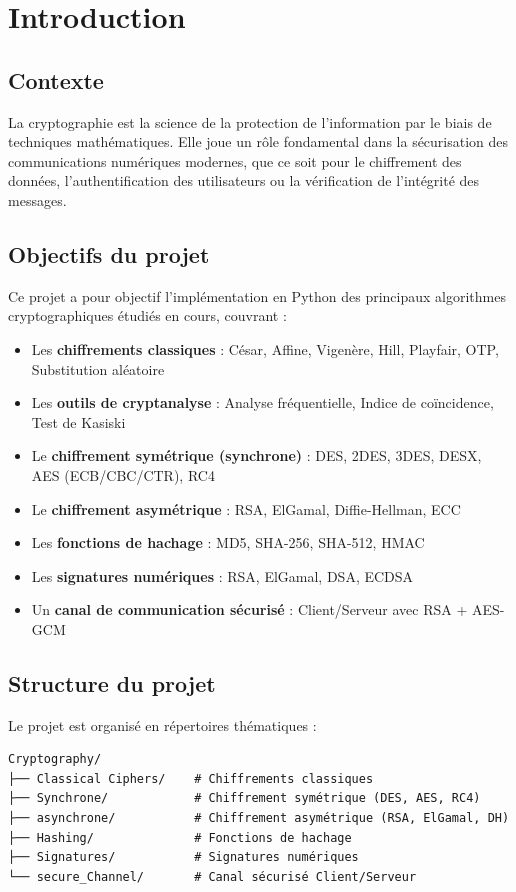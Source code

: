 \documentclass[12pt,a4paper]{report}
\begin{document}
\tableofcontents
\newpage

\chapter{Introduction}

\section{Contexte}
La cryptographie est la science de la protection de l'information par le biais de techniques mathématiques. Elle joue un rôle fondamental dans la sécurisation des communications numériques modernes, que ce soit pour le chiffrement des données, l'authentification des utilisateurs ou la vérification de l'intégrité des messages.

\section{Objectifs du projet}
Ce projet a pour objectif l'implémentation en Python des principaux algorithmes cryptographiques étudiés en cours, couvrant :
\begin{itemize}
    \item Les \textbf{chiffrements classiques} : César, Affine, Vigenère, Hill, Playfair, OTP, Substitution aléatoire
    \item Les \textbf{outils de cryptanalyse} : Analyse fréquentielle, Indice de coïncidence, Test de Kasiski
    \item Le \textbf{chiffrement symétrique (synchrone)} : DES, 2DES, 3DES, DESX, AES (ECB/CBC/CTR), RC4
    \item Le \textbf{chiffrement asymétrique} : RSA, ElGamal, Diffie-Hellman, ECC
    \item Les \textbf{fonctions de hachage} : MD5, SHA-256, SHA-512, HMAC
    \item Les \textbf{signatures numériques} : RSA, ElGamal, DSA, ECDSA
    \item Un \textbf{canal de communication sécurisé} : Client/Serveur avec RSA + AES-GCM
\end{itemize}

\section{Structure du projet}
Le projet est organisé en répertoires thématiques :
\begin{verbatim}
Cryptography/
├── Classical Ciphers/    # Chiffrements classiques
├── Synchrone/            # Chiffrement symétrique (DES, AES, RC4)
├── asynchrone/           # Chiffrement asymétrique (RSA, ElGamal, DH)
├── Hashing/              # Fonctions de hachage
├── Signatures/           # Signatures numériques
└── secure_Channel/       # Canal sécurisé Client/Serveur
\end{verbatim}
\end{document}
